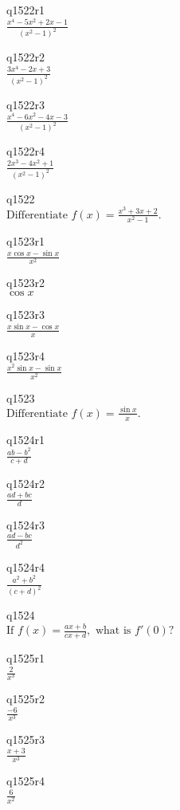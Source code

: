 q1522r1\\
\(\displaystyle \frac{x^4 - 5x^2 + 2x - 1}{(x^2-1)^2} \)

q1522r2\\
\(\displaystyle \frac{3x^4 - 2x + 3}{(x^2-1)^2} \)

q1522r3\\
\(\displaystyle \frac{x^4 - 6x^2 - 4x - 3}{(x^2-1)^2} \)

q1522r4\\
\(\displaystyle \frac{2x^3 - 4x^2 + 1}{(x^2-1)^2} \)

q1522\\
\(\displaystyle \text{Differentiate } f(x) = \frac{x^3 + 3x + 2}{x^2-1}. \)

q1523r1\\
\(\displaystyle \frac{x\cos x - \sin x}{x^2} \)

q1523r2\\
\(\displaystyle \cos x \)

q1523r3\\
\(\displaystyle \frac{x \sin x - \cos x}{x} \)

q1523r4\\
\(\displaystyle \frac{x^2 \sin x - \sin x}{x^2} \)

q1523\\
\(\displaystyle \text{Differentiate } f(x) = \frac{\sin x}{x}. \)

q1524r1\\
\(\displaystyle \frac{ab - b^2}{c+d} \)

q1524r2\\
\(\displaystyle \frac{ad + bc}{d} \)

q1524r3\\
\(\displaystyle \frac{ad - bc}{d^2} \)

q1524r4\\
\(\displaystyle \frac{a^2 + b^2}{(c+d)^2} \)

q1524\\
\(\displaystyle \text{If } f(x) = \frac{ax + b}{cx + d}, \text{ what is } f'(0)? \)

q1525r1\\
\(\displaystyle \frac{2}{x^3} \)

q1525r2\\
\(\displaystyle \frac{-6}{x^3} \)

q1525r3\\
\(\displaystyle \frac{x+3}{x^3} \)

q1525r4\\
\(\displaystyle \frac{6}{x^2} \)

